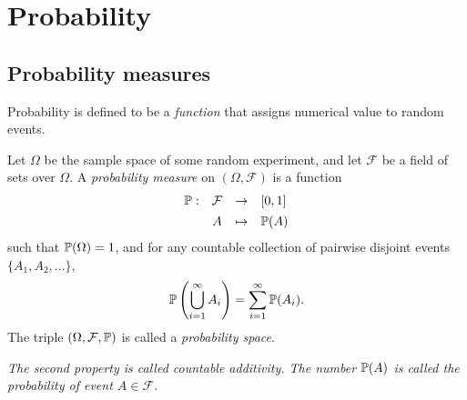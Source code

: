 \chapter{Probability}\label{chap:prob}

\section{Probability measures}
Probability is defined to be a \emph{function} that assigns numerical value to random events.

\begin{definition}
Let $\Omega$ be the sample space of some random experiment, and let $\mathcal{F}$ be a field of sets over $\Omega$. A \emph{probability measure} on $(\Omega,\mathcal{F})$ is a function 
\[
\begin{array}{rccl}
	\mathbb{P}:	& \mathcal{F}	& \to	& [0,1] \\[1ex]
			& A				& \mapsto	& \mathbb{P}(A)
\end{array}
\]
such that $\mathbb{P}(\Omega) = 1$, and for any countable collection of pairwise disjoint events $\{A_1,A_2,\ldots\}$,
\[
\mathbb{P}\left(\bigcup_{i=1}^\infty A_i\right) = \sum_{i=1}^{\infty} \mathbb{P}(A_i).
\]
The triple $(\Omega,\mathcal{F},\mathbb{P})$ is called a \emph{probability space}.
\end{definition}

\begin{remark}
\bit
\it The second property is called \emph{countable additivity}.
\it The number $\mathbb{P}(A)$ is called the \emph{probability} of event $A\in\mathcal{F}$.
\eit
\end{remark}

\break

